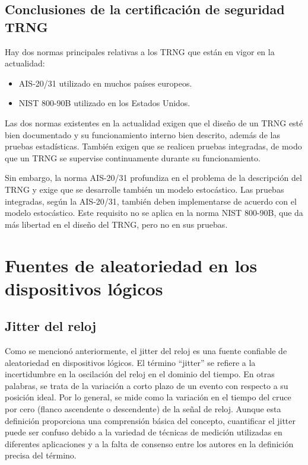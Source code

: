 		\subsection{Conclusiones de la certificación de seguridad TRNG}
		
            Hay dos normas principales relativas a los TRNG que están en vigor en la actualidad:
            
            \begin{itemize}[noitemsep]
                \item AIS-20/31 utilizado en muchos países europeos. \cite{AIS2011}
                \item NIST 800-90B utilizado en los Estados Unidos. \cite{Turan2018}
            \end{itemize}
        
            Las dos normas existentes en la actualidad exigen que el diseño de un TRNG esté bien documentado y su funcionamiento interno bien descrito, además de las pruebas estadísticas. También exigen que se realicen pruebas integradas, de modo que un TRNG se supervise continuamente durante su funcionamiento.
        
            Sin embargo, la norma AIS-20/31 profundiza en el problema de la descripción del TRNG y exige que se desarrolle también un modelo estocástico. Las pruebas integradas, según la AIS-20/31, también deben implementarse de acuerdo con el modelo estocástico. Este requisito no se aplica en la norma NIST 800-90B, que da más libertad en el diseño del TRNG, pero no en sus pruebas.

    \section{Fuentes de aleatoriedad en los dispositivos lógicos}

        \subsection{Jitter del reloj}

            Como se mencionó anteriormente, el jitter del reloj es una fuente confiable de aleatoriedad en dispositivos lógicos. El término ``jitter'' se refiere a la incertidumbre en la oscilación del reloj en el dominio del tiempo. En otras palabras, se trata de la variación a corto plazo de un evento con respecto a su posición ideal. Por lo general, se mide como la variación en el tiempo del cruce por cero (flanco ascendente o descendente) de la señal de reloj. Aunque esta definición proporciona una comprensión básica del concepto, cuantificar el jitter puede ser confuso debido a la variedad de técnicas de medición utilizadas en diferentes aplicaciones y a la falta de consenso entre los autores en la definición precisa del término.

